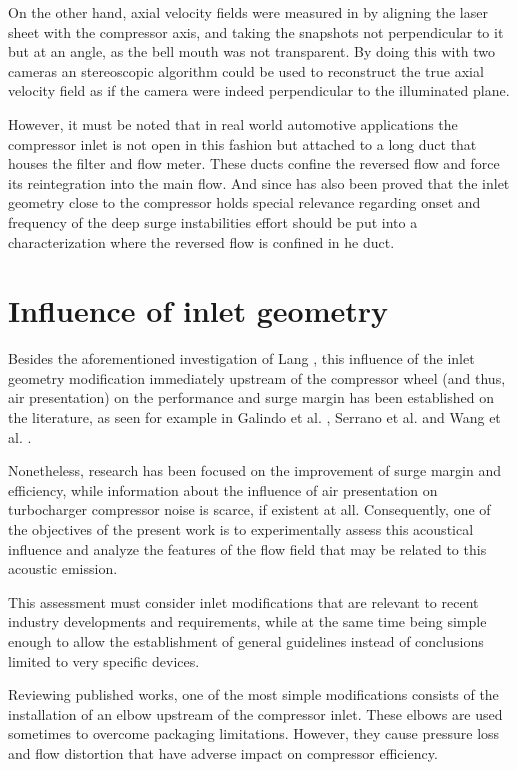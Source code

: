 On the other hand, axial velocity fields were measured in \cite{guillou2010characterization,guillou2012piv} by aligning the laser sheet with the compressor axis, and taking the snapshots not perpendicular to it but at an angle, as the bell mouth was not transparent. By doing this with two cameras an stereoscopic algorithm could be used to reconstruct the true axial velocity field as if the camera were indeed perpendicular to the illuminated plane.

However, it must be noted that in real world automotive applications the compressor inlet is not open in this fashion but attached to a long duct that houses the filter and flow meter. These ducts confine the reversed flow and force its reintegration into the main flow. And since has also been proved that the inlet geometry close to the compressor holds special relevance regarding onset and frequency of the deep surge instabilities \cite{galindo2013engine} effort should be put into a characterization where the reversed flow is confined in he duct.

\section{Influence of inlet geometry}
\label{sec:liter_influence}

Besides the aforementioned investigation of Lang \cite{lang2011contribucion}, this influence of the inlet geometry modification immediately upstream of the compressor wheel (and thus, air presentation) on the performance and surge margin has been established on the literature, as seen for example in Galindo et al. \cite{galindo2007potential}, Serrano et al. \cite{serrano2013optimization} and Wang et al. \cite{wang2013change}.

Nonetheless, research has been focused on the improvement of surge margin and efficiency, while information about the influence of air presentation on turbocharger compressor noise is scarce, if existent at all. Consequently, one of the objectives of the present work is to experimentally assess this acoustical influence and analyze the features of the flow field that may be related to this acoustic emission.

This assessment must consider inlet modifications that are relevant to recent industry developments and requirements, while at the same time being simple enough to allow the establishment of general guidelines instead of conclusions limited to very specific devices.

Reviewing published works, one of the most simple modifications consists of the installation of an elbow upstream of the compressor inlet. These elbows are used sometimes to overcome packaging limitations. However, they cause pressure loss \cite{engeda2003inlet,li2012numerical} and flow distortion \cite{serrano2013optimization} that have adverse impact on compressor efficiency.

